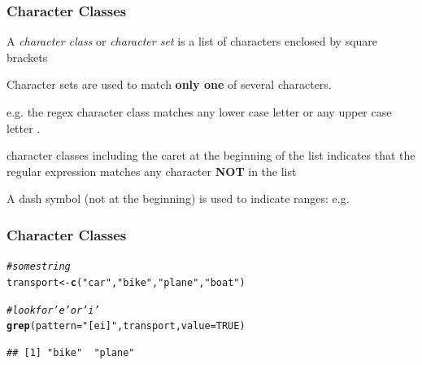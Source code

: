 \documentclass[12pt]{beamer}\usepackage[]{graphicx}\usepackage[]{color}
\makeatletter
\newcommand{\hlnum}[1]{\textcolor[rgb]{0.686,0.059,0.569}{#1}}%
\newcommand{\hlstr}[1]{\textcolor[rgb]{0.192,0.494,0.8}{#1}}%
\newcommand{\hlcom}[1]{\textcolor[rgb]{0.678,0.584,0.686}{\textit{#1}}}%
\newcommand{\hlstd}[1]{\textcolor[rgb]{0.345,0.345,0.345}{#1}}%
\newcommand{\hlkwb}[1]{\textcolor[rgb]{0.69,0.353,0.396}{#1}}%
\newcommand{\hlkwc}[1]{\textcolor[rgb]{0.333,0.667,0.333}{#1}}%
\newcommand{\hlkwd}[1]{\textcolor[rgb]{0.737,0.353,0.396}{\textbf{#1}}}%
\newenvironment{kframe}{%
 \def\at@end@of@kframe{}%
 \ifinner\ifhmode%
  \def\at@end@of@kframe{\end{minipage}}%
  \begin{minipage}{\columnwidth}%
 \fi\fi%
 \def\FrameCommand##1{\hskip\@totalleftmargin \hskip-\fboxsep
 \colorbox{shadecolor}{##1}\hskip-\fboxsep
     \hskip-\linewidth \hskip-\@totalleftmargin \hskip\columnwidth}%
 \MakeFramed {\advance\hsize-\width
   \@totalleftmargin\z@ \linewidth\hsize
   \@setminipage}}%
 {\par\unskip\endMakeFramed%
 \at@end@of@kframe}
\newenvironment{knitrout}{}{} %
\makeatother
\begin{document}
\begin{frame}[fragile]
\frametitle{Character Classes}

\bi
  \item A \textit{character class} or \textit{character set} is a list of characters enclosed by square brackets \code{[ ]}
  \item Character sets are used to match \textbf{only one} of several characters.
  \item e.g. the regex character class \code{[aA]} matches any lower case letter  or any upper case letter .
  \item character classes including the caret {\hilit \code{\^}} at the beginning of the list indicates that the regular expression matches any character \textbf{NOT} in the list
  \item A dash symbol {\hilit \code{-}} (not at the beginning) is used to indicate ranges: e.g. \code{[0-9]}
\ei

\end{frame}


\begin{frame}[fragile]
\frametitle{Character Classes}
\begin{knitrout}\footnotesize
{}\color{fgcolor}\begin{kframe}
\begin{alltt}
\hlcom{# some string}
\hlstd{transport} \hlkwb{<-} \hlkwd{c}\hlstd{(}\hlstr{"car"}\hlstd{,} \hlstr{"bike"}\hlstd{,} \hlstr{"plane"}\hlstd{,} \hlstr{"boat"}\hlstd{)}

\hlcom{# look for 'e' or 'i'}
\hlkwd{grep}\hlstd{(}\hlkwc{pattern} \hlstd{=} \hlstr{"[ei]"}\hlstd{, transport,} \hlkwc{value} \hlstd{=} \hlnum{TRUE}\hlstd{)}
\end{alltt}
\begin{verbatim}
## [1] "bike"  "plane"
\end{verbatim}
\end{kframe}
\end{knitrout}

\end{frame}

\end{document}
